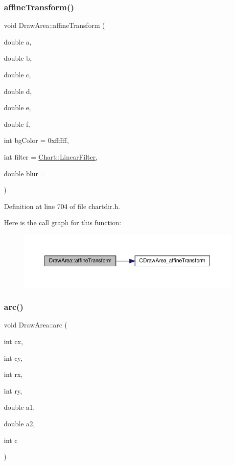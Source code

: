\subsubsection{\texorpdfstring{affine\+Transform()}{affineTransform()}}
{\footnotesize\ttfamily void Draw\+Area\+::affine\+Transform (\begin{DoxyParamCaption}\item[{double}]{a,  }\item[{double}]{b,  }\item[{double}]{c,  }\item[{double}]{d,  }\item[{double}]{e,  }\item[{double}]{f,  }\item[{int}]{bg\+Color = {\ttfamily 0xffffff},  }\item[{int}]{filter = {\ttfamily \hyperlink{namespace_chart_ab75b9aa1781d0e0159ef1d441b577764a8cd729b7a982bac2dce8b021511e3ac6}{Chart\+::\+Linear\+Filter}},  }\item[{double}]{blur = {} }\end{DoxyParamCaption})\hspace{0.3cm}{\ttfamily [inline]}}



Definition at line 704 of file chartdir.\+h.

Here is the call graph for this function\+:
\nopagebreak
\begin{figure}[H]
\begin{center}
\leavevmode
\includegraphics[width=350pt]{class_draw_area_a343cccf1664650a3d120f58963ec0286_cgraph}
\end{center}
\end{figure}
\mbox{\label{class_draw_area_ab04d989712f8d711d0b0870d5ea82181}} 
\subsubsection{\texorpdfstring{arc()}{arc()}}
{\footnotesize\ttfamily void Draw\+Area\+::arc (\begin{DoxyParamCaption}\item[{int}]{cx,  }\item[{int}]{cy,  }\item[{int}]{rx,  }\item[{int}]{ry,  }\item[{double}]{a1,  }\item[{double}]{a2,  }\item[{int}]{c }\end{DoxyParamCaption})\hspace{0.3cm}{\ttfamily [inline]}}



